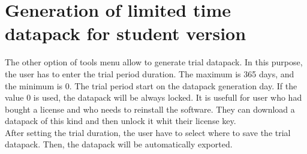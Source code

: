 \section{Generation of limited time datapack for student version}%

The other option of tools menu allow to generate trial datapack. In this purpose, the user has to enter the trial period duration. The maximum is 365 days, and the minimum is 0. The trial period start on the datapack generation day. If the value 0 is used, the datapack will be always locked. It is usefull for user who had bought a license and who needs to reinstall the software. They can download a datapack of this kind and then unlock it whit their license key.\\

After setting the trial duration, the user have to select where to save the trial datapack. Then, the datapack will be automatically exported.\\


